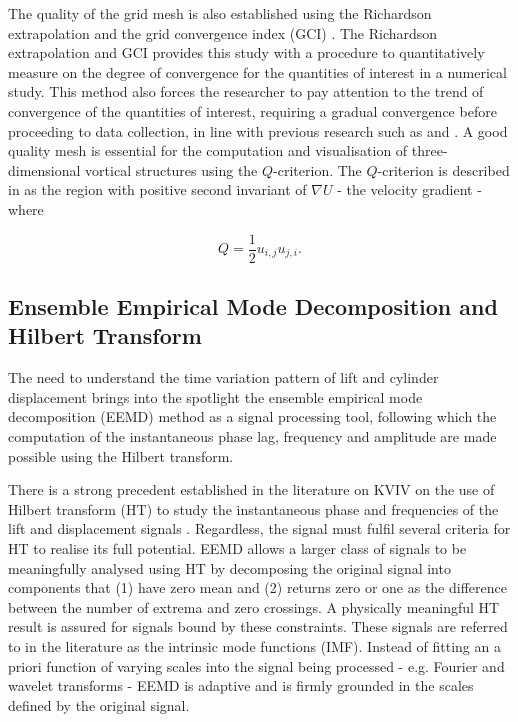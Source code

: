 \documentclass[oneside]{utmthesis}
\begin{document}
The quality of the grid mesh is also established using the Richardson extrapolation and the grid convergence index (GCI) \citep{Stern2001}. The Richardson extrapolation \citep{Richardson1927} and GCI provides this study with a procedure to quantitatively measure on the degree of convergence for the quantities of interest in a numerical study. This method also forces the researcher to pay attention to the trend of convergence of the quantities of interest, requiring a gradual convergence before proceeding to data collection, in line with previous research such as \citet{MatAli2011} and \citet{Maruai2018}. A good quality mesh is essential for the computation and visualisation of three-dimensional vortical structures using the $Q$-criterion. The $Q$-criterion is described in \citet{Jeong1995} as the region with positive second invariant of $\nabla U$ - the velocity gradient - where

\begin{equation}
  Q = \frac{1}{2} u_{i,j}u_{j,i}.
  \label{eq:qCriterion}
\end{equation}

\subsection{Ensemble Empirical Mode Decomposition and Hilbert Transform} \label{ssec:eemd}
The need to understand the time variation pattern of lift and cylinder displacement brings into the spotlight the ensemble empirical mode decomposition (EEMD) method \citep{Huang1998,Wu2008} as a signal processing tool, following which the computation of the instantaneous phase lag, frequency and amplitude are made possible using the Hilbert transform.

There is a strong precedent established in the literature on KVIV on the use of Hilbert transform (HT) to study the instantaneous phase and frequencies of the lift and displacement signals \citep{Khalak1999}. Regardless, the signal must fulfil several criteria for HT to realise its full potential. EEMD allows a larger class of signals to be meaningfully analysed using HT by decomposing the original signal into components that (1) have zero mean and (2) returns zero or one as the difference between the number of extrema and zero crossings. A physically meaningful HT result is assured for signals bound by these constraints. These signals are referred to in the literature as the intrinsic mode functions (IMF). Instead of fitting an a priori function of varying scales into the signal being processed - e.g. Fourier and wavelet transforms - EEMD is adaptive and is firmly grounded in the scales defined by the original signal.
\end{document}
